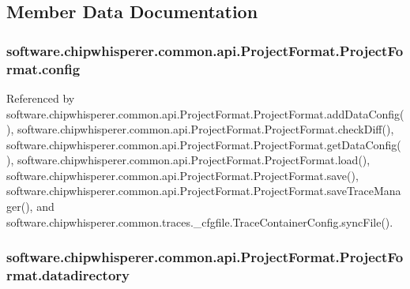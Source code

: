 \subsection{Member Data Documentation}
\hypertarget{classsoftware_1_1chipwhisperer_1_1common_1_1api_1_1ProjectFormat_1_1ProjectFormat_a5111622c8372929c0eec5fdc3ab6cf42}{}
\subsubsection[{config}]{\setlength{\rightskip}{0pt plus 5cm}software.\+chipwhisperer.\+common.\+api.\+Project\+Format.\+Project\+Format.\+config}\label{classsoftware_1_1chipwhisperer_1_1common_1_1api_1_1ProjectFormat_1_1ProjectFormat_a5111622c8372929c0eec5fdc3ab6cf42}


Referenced by software.\+chipwhisperer.\+common.\+api.\+Project\+Format.\+Project\+Format.\+add\+Data\+Config(), software.\+chipwhisperer.\+common.\+api.\+Project\+Format.\+Project\+Format.\+check\+Diff(), software.\+chipwhisperer.\+common.\+api.\+Project\+Format.\+Project\+Format.\+get\+Data\+Config(), software.\+chipwhisperer.\+common.\+api.\+Project\+Format.\+Project\+Format.\+load(), software.\+chipwhisperer.\+common.\+api.\+Project\+Format.\+Project\+Format.\+save(), software.\+chipwhisperer.\+common.\+api.\+Project\+Format.\+Project\+Format.\+save\+Trace\+Manager(), and software.\+chipwhisperer.\+common.\+traces.\+\_\+cfgfile.\+Trace\+Container\+Config.\+sync\+File().

\hypertarget{classsoftware_1_1chipwhisperer_1_1common_1_1api_1_1ProjectFormat_1_1ProjectFormat_a81af49d16e2c9b02b3a2334700e38c67}{}
\subsubsection[{datadirectory}]{\setlength{\rightskip}{0pt plus 5cm}software.\+chipwhisperer.\+common.\+api.\+Project\+Format.\+Project\+Format.\+datadirectory}\label{classsoftware_1_1chipwhisperer_1_1common_1_1api_1_1ProjectFormat_1_1ProjectFormat_a81af49d16e2c9b02b3a2334700e38c67}


